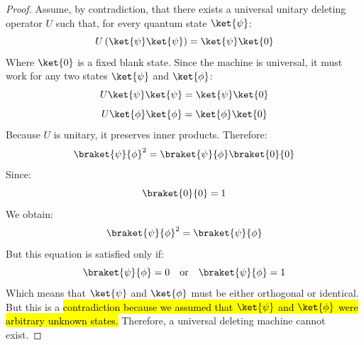 \begin{itemize}
        \begin{proof}
            Assume, by contradiction, that there exists a universal unitary deleting operator $U$ such that, for every quantum state $\ket{\psi}$:
            \begin{equation*}
                U\left(\ket{\psi}\ket{\psi}\right)
                =
                \ket{\psi}\ket{0}
            \end{equation*}
            Where $\ket{0}$ is a fixed blank state. Since the machine is universal, it must work for any two states $\ket{\psi}$ and $\ket{\phi}$:
            \begin{equation*}
                U\ket{\psi}\ket{\psi}
                =
                \ket{\psi}\ket{0}
            \end{equation*}
            \begin{equation*}
                U\ket{\phi}\ket{\phi}
                =
                \ket{\phi}\ket{0}
            \end{equation*}
            Because $U$ is unitary, it preserves inner products. Therefore:
            \begin{equation*}
                \braket{\psi}{\phi}^2
                =
                \braket{\psi}{\phi}\braket{0}{0}
            \end{equation*}
            Since:
            \begin{equation*}
                \braket{0}{0}=1
            \end{equation*}
            We obtain:
            \begin{equation*}
                \braket{\psi}{\phi}^2
                =
                \braket{\psi}{\phi}
            \end{equation*}
            But this equation is satisfied only if:
            \begin{equation*}
                \braket{\psi}{\phi} = 0 \quad \text{or} \quad \braket{\psi}{\phi} = 1
            \end{equation*}
            Which means that $\ket{\psi}$ and $\ket{\phi}$ must be either orthogonal or identical. But this is a \hl{contradiction because we assumed that $\ket{\psi}$ and $\ket{\phi}$ were arbitrary unknown states.} Therefore, a universal deleting machine cannot exist.
        \end{proof}
\end{itemize}

\newpage

